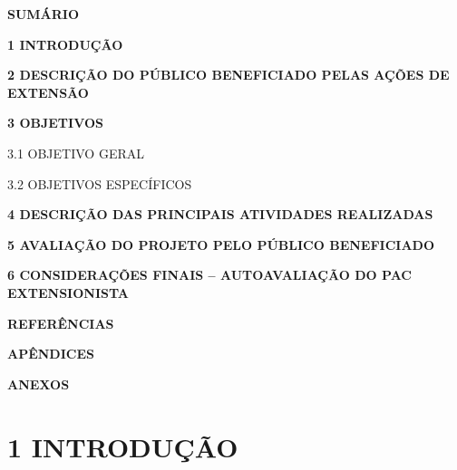 \documentclass[12pt, a4paper]{article}
\begin{document}
\newpage
\thispagestyle{fancy}
 
\begin{center}
  {\bfseries SUM\'ARIO}
\end{center}
 
\vspace{12pt}
 
\noindent\textbf{1 INTRODU\c{C}\~AO} \dotfill \pageref{sec:intro}
 
\vspace{4pt}
\noindent\textbf{2 DESCRI\c{C}\~AO DO P\'UBLICO BENEFICIADO PELAS A\c{C}\~OES DE EXTENS\~AO} \dotfill \pageref{sec:publico}
 
\vspace{4pt}
\noindent\textbf{3 OBJETIVOS} \dotfill \pageref{sec:objetivos}
 
\vspace{2pt}
\noindent\hspace{1em}3.1 OBJETIVO GERAL \dotfill \pageref{sec:obj_geral}
 
\vspace{2pt}
\noindent\hspace{1em}3.2 OBJETIVOS ESPEC\'IFICOS \dotfill \pageref{sec:obj_especificos}
 
\vspace{4pt}
\noindent\textbf{4 DESCRI\c{C}\~AO DAS PRINCIPAIS ATIVIDADES REALIZADAS} \dotfill \pageref{sec:atividades}
 
\vspace{4pt}
\noindent\textbf{5 AVALIA\c{C}\~AO DO PROJETO PELO P\'UBLICO BENEFICIADO} \dotfill \pageref{sec:avaliacao}
 
\vspace{4pt}
\noindent\textbf{6 CONSIDERA\c{C}\~OES FINAIS -- AUTOAVALIA\c{C}\~AO DO PAC EXTENSIONISTA} \dotfill \pageref{sec:consideracoes}
 
\vspace{4pt}
\noindent\textbf{REFER\^ENCIAS} \dotfill \pageref{sec:referencias}
 
\vspace{4pt}
\noindent\textbf{AP\^ENDICES} \dotfill \pageref{sec:apendices}
 
\vspace{4pt}
\noindent\textbf{ANEXOS} \dotfill \pageref{sec:anexos}
 
\newpage
{}
\label{sec:intro}
\section*{1 INTRODU\c{C}\~AO}
 
\end{document}
